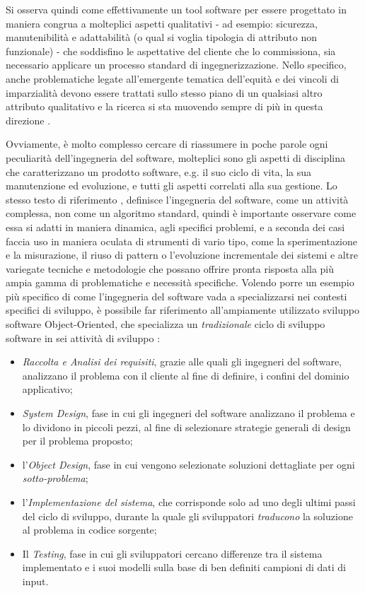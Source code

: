 Si osserva quindi come effettivamente un tool software per essere progettato in maniera congrua a molteplici aspetti qualitativi - ad esempio: sicurezza, manutenibilità e adattabilità (o qual si voglia tipologia di attributo non funzionale) - che soddisfino le aspettative del cliente che lo commissiona, sia necessario applicare un processo standard di ingegnerizzazione. Nello specifico, anche problematiche legate all'emergente tematica dell'equità e dei vincoli di imparzialità devono essere trattati sullo stesso piano di un qualsiasi altro attributo qualitativo e la ricerca si sta muovendo sempre di più in questa direzione \cite{brun2018software}.

Ovviamente, è molto complesso cercare di riassumere in poche parole ogni peculiarità dell'ingegneria del software, molteplici sono gli aspetti di disciplina che caratterizzano un prodotto software, e.g. il suo ciclo di vita, la sua manutenzione ed evoluzione, e tutti gli aspetti correlati alla sua gestione. Lo stesso testo di riferimento \cite{Bruegge2009ObjectOrientedSE}, definisce l'ingegneria del software, come un attività complessa, non come un algoritmo standard, quindi è importante osservare come essa si adatti in maniera dinamica, agli specifici problemi, e a seconda dei casi faccia uso in maniera oculata di strumenti di vario tipo, come la sperimentazione e la misurazione, il riuso di pattern o l'evoluzione incrementale dei sistemi \cite{Bruegge2009ObjectOrientedSE} e altre variegate tecniche e metodologie che possano offrire pronta risposta alla più ampia gamma di problematiche e necessità specifiche. Volendo porre un esempio più specifico di come l'ingegneria del software vada a specializzarsi nei contesti specifici di sviluppo, è possibile far riferimento all'ampiamente utilizzato sviluppo software Object-Oriented, che specializza un \emph{tradizionale} ciclo di sviluppo software in sei attività di sviluppo \cite{Bruegge2009ObjectOrientedSE}: 

\begin{itemize}
    \item  \emph{Raccolta e Analisi dei requisiti}, grazie alle quali gli ingegneri del software, analizzano il problema con il cliente al fine di definire, i confini del dominio applicativo;
    \item \emph{System Design}, fase in cui gli ingegneri del software analizzano il problema e lo dividono in piccoli pezzi, al fine di selezionare strategie generali di design per il problema proposto;
    \item l'\emph{Object Design}, fase in cui vengono selezionate soluzioni dettagliate per ogni \emph{sotto-problema};
    \item l'\emph{Implementazione del sistema}, che corrisponde solo ad uno degli ultimi passi del ciclo di sviluppo, durante la quale gli sviluppatori \emph{traducono} la soluzione al problema in codice sorgente;
    \item Il \emph{Testing}, fase in cui gli sviluppatori cercano differenze tra il sistema implementato e i suoi modelli sulla base di ben definiti campioni di dati di input.
\end{itemize}


